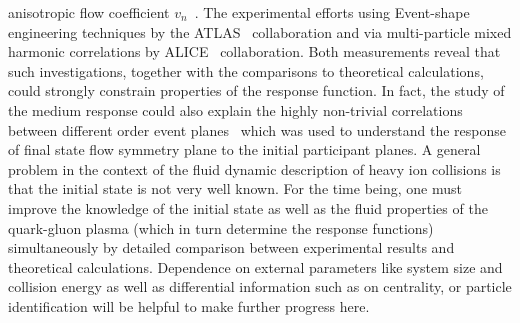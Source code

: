   anisotropic flow coefficient $v_n$~\cite{HION-2012-03,HION-2014-03}. 
The experimental efforts using Event-shape engineering techniques by the 
  ATLAS~\cite{HION-2014-03} collaboration and via multi-particle 
  mixed harmonic correlations by ALICE~\cite{ALICE:2016kpq} collaboration. 
Both measurements reveal that such investigations, 
	 together with the comparisons to theoretical calculations, could strongly
  constrain properties of the response function. 
In fact, the study of the medium response could also explain the highly non-trivial 
  correlations between different order event planes~\cite{HION-2012-03}
  which was used to understand the response of final state flow symmetry
  plane to the initial participant planes.
A general problem in the context of the fluid dynamic description of heavy 
  ion collisions is that the initial state is not very well known. 
For the time being, one must improve the knowledge of the initial state 
  as well as the fluid properties of the quark-gluon plasma (which in turn 
  determine the response functions) simultaneously by detailed comparison 
  between experimental results and theoretical calculations. 
Dependence on external parameters like system size and collision energy as 
  well as differential information such as on centrality, or particle 
  identification will be helpful to make further progress here. 



